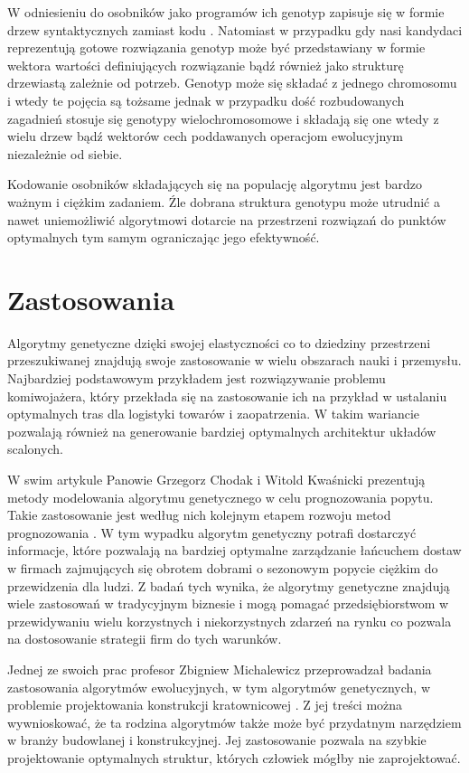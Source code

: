 \documentclass[12pt, oneside, a4paper]{report}
\begin{document}
W odniesieniu do osobników jako programów ich genotyp zapisuje się w formie drzew syntaktycznych zamiast kodu \citep{poli08:fieldguide}. Natomiast w przypadku gdy nasi kandydaci reprezentują gotowe rozwiązania genotyp może być przedstawiany w formie wektora wartości definiujących rozwiązanie bądź również jako strukturę drzewiastą zależnie od potrzeb. Genotyp może się składać z jednego chromosomu i wtedy te pojęcia są tożsame jednak w przypadku dość rozbudowanych zagadnień stosuje się genotypy wielochromosomowe i składają się one wtedy z wielu drzew bądź wektorów cech poddawanych operacjom ewolucyjnym niezależnie od siebie.

Kodowanie osobników składających się na populację algorytmu jest bardzo ważnym i ciężkim zadaniem. Źle dobrana struktura genotypu może utrudnić a nawet uniemożliwić algorytmowi dotarcie na przestrzeni rozwiązań do punktów optymalnych tym samym ograniczając jego efektywność.

\section{Zastosowania}

Algorytmy genetyczne dzięki swojej elastyczności co  to dziedziny przestrzeni przeszukiwanej znajdują swoje zastosowanie w wielu obszarach nauki i przemysłu. Najbardziej podstawowym przykładem jest rozwiązywanie problemu komiwojażera, który przekłada się na zastosowanie ich na przykład w ustalaniu optymalnych tras dla logistyki towarów i zaopatrzenia. W takim wariancie pozwalają również na generowanie bardziej optymalnych architektur układów scalonych.

W swim artykule Panowie Grzegorz Chodak i Witold Kwaśnicki prezentują metody modelowania algorytmu genetycznego w celu prognozowania popytu. Takie zastosowanie jest według nich kolejnym etapem rozwoju metod prognozowania \citep{chodak2002zastosowanie}. W tym wypadku algorytm genetyczny potrafi dostarczyć informacje, które pozwalają na bardziej optymalne zarządzanie łańcuchem dostaw w firmach zajmujących się obrotem dobrami o sezonowym popycie ciężkim do przewidzenia dla ludzi. Z badań tych wynika, że algorytmy genetyczne znajdują wiele zastosowań w tradycyjnym biznesie i mogą pomagać przedsiębiorstwom w przewidywaniu wielu korzystnych i niekorzystnych zdarzeń na rynku co pozwala na dostosowanie strategii firm do tych warunków.

Jednej ze swoich prac profesor Zbigniew Michalewicz przeprowadzał badania zastosowania algorytmów ewolucyjnych, w tym algorytmów genetycznych, w problemie projektowania konstrukcji kratownicowej \citep{michalewicz1996evolutionary}. Z jej treści można wywnioskować, że ta rodzina algorytmów także może być przydatnym narzędziem w branży budowlanej i konstrukcyjnej. Jej zastosowanie pozwala na szybkie projektowanie optymalnych struktur, których człowiek mógłby nie zaprojektować.  
\end{document}
